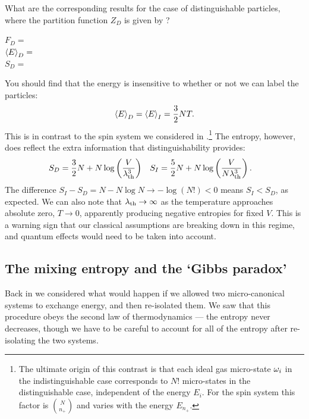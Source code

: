 \newpage %
What are the corresponding results for the case of distinguishable particles, where the partition function $Z_D$ is given by ?
\begin{mdframed}
  $\displaystyle F_D = $ \\[50 pt]
  $\displaystyle \left\langle E \right\rangle_D = $ \\[50 pt]
  $\displaystyle S_D = $ \\[50 pt]
\end{mdframed}
You should find that the energy is insensitive to whether or not we can label the particles:
\begin{equation}
  \label{eq:ideal_energy}
  \left\langle E \right\rangle_D = \left\langle E \right\rangle_I = \frac{3}{2} NT.
\end{equation}
This is in contrast to the spin system we considered in .\footnote{The ultimate origin of this contrast is that each ideal gas micro-state $\omega_i$ in the indistinguishable case corresponds to $N!$ micro-states in the distinguishable case, independent of the energy $E_i$.  For the spin system this factor is $\binom{N}{n_+}$ and varies with the energy $E_{n_+}$.}
The entropy, however, does reflect the extra information that distinguishability provides: %
\begin{align}
  \label{eq:ideal_entropy}
  S_D & = \frac{3}{2} N + N \log\left(\frac{V}{\lambda_{\mathrm{th}}^3}\right) &
  S_I & = \frac{5}{2} N + N \log\left(\frac{V}{N\lambda_{\mathrm{th}}^3}\right).
\end{align}
The difference $S_I - S_D = N - N\log N \to -\log(N!) < 0$ means $S_I < S_D$, as expected.
We can also note that $\lambda_{\mathrm{th}} \to \infty$ as the temperature approaches absolute zero, $T \to 0$, apparently producing negative entropies for fixed $V$.
This is a warning sign that our classical assumptions are breaking down in this regime, and quantum effects would need to be taken into account.



\subsection{The mixing entropy and the `Gibbs paradox'}
Back in  we considered what would happen if we allowed two micro-canonical systems to exchange energy, and then re-isolated them.
We saw that this procedure obeys the second law of thermodynamics --- the entropy never decreases, though we have to be careful to account for all of the entropy after re-isolating the two systems.

